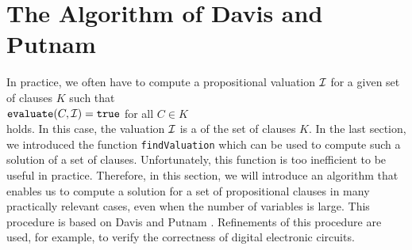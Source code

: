 
\section{The Algorithm of Davis and Putnam}
In practice, we often have to compute a propositional valuation $\mathcal{I}$ for a given set of clauses $K$ such that
\\[0.2cm]
\hspace*{1.3cm} $\texttt{evaluate}(C,\mathcal{I}) = \texttt{true}$ \quad for all $C \in K$ \\[0.2cm]
holds. In this case,  the valuation $\mathcal{I}$ is a  of the set of clauses $K$. In
the last section, we introduced the function \texttt{findValuation} which can be used to compute
such a solution of a set of clauses.  Unfortunately, this function is too inefficient to be useful in
practice.
Therefore, in this section, we will introduce an algorithm that enables us to compute a solution for a
set of propositional clauses in many practically relevant cases, even when the number of variables is
large. This procedure is based on Davis and Putnam \cite{davis:1960, davis:1962}. Refinements of this procedure
\cite{moskewicz:2001} are used, for example, to verify the correctness of digital electronic circuits. 


